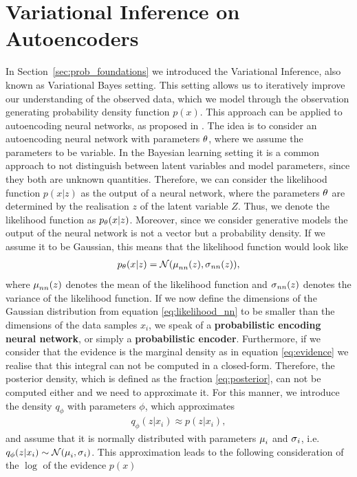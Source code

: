 \section{Variational Inference on Autoencoders}\label{sec:vi_on_ae}

In Section~\ref{sec:prob_foundations} we introduced the Variational Inference, also known as Variational Bayes setting. This setting allows us to iteratively improve our understanding of the observed data, which we model through the observation generating probability density function $p(x)$. This approach can be applied to autoencoding neural networks, as proposed in \cite{kingma2013auto}. The idea is to consider an autoencoding neural network with parameters $\theta$, where we assume the parameters to be variable. In the Bayesian learning setting it is a common approach to not distinguish between latent variables and model parameters, since they both are unknown quantities. Therefore, we can consider the likelihood function $p(x|z)$ as the output of a neural network, where the parameters $\theta$ are determined by the realisation $z$ of the latent variable $Z$. Thus, we denote the likelihood function as $p_\theta(x|z)$. Moreover, since we consider generative models the output of the neural network is not a vector but a probability density. If we assume it to be Gaussian, this means that the likelihood function would look like
\begin{align}\label{eq:likelihood_nn}
p_\theta(x|z) = \mathcal{N} (\operatorname{\mu}_{nn}(z), \operatorname{\sigma}_{nn}(z)),
\end{align}
where $\operatorname{\mu}_{nn}(z)$ denotes the mean of the likelihood function and $\operatorname{\sigma}_{nn}(z)$  denotes the variance of the likelihood function. If we now define the dimensions of the Gaussian distribution from equation \eqref{eq:likelihood_nn} to be smaller than the dimensions of the data samples $x_i$, we speak of a \textbf{probabilistic encoding neural network}, or simply a \textbf{probabilistic encoder}.  Furthermore, if we consider that the evidence is the marginal density as in equation \eqref{eq:evidence} we realise that this integral can not be computed in a closed-form. Therefore, the posterior density, which is defined as the fraction \eqref{eq:posterior}, can not be computed either and we need to approximate it. For this manner, we introduce the density $q_{\phi}$ with parameters $\phi$, which approximates
\begin{align*}
q_{\phi}(z|x_i) \approx p(z|x_i),
\end{align*}
and assume that it is normally distributed with parameters $\operatorname{\mu}_i$ and $\operatorname{\sigma}_i$, i.e. $q_{\phi}(z|x_i) \sim \mathcal{N} (\operatorname{\mu}_i, \operatorname{\sigma}_i)$. This approximation leads to the following consideration of the $\log$ of the evidence $p(x)$

